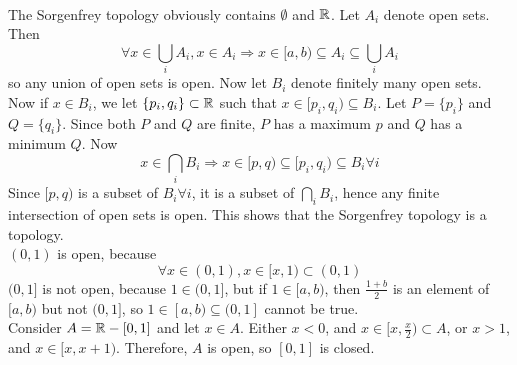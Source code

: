 \begin{solution}
 \\The Sorgenfrey topology obviously contains $\emptyset$ and $\mathbb{R}$. Let $A_i$ denote open sets. Then
 $$\forall x \in \bigcup_i A_i, x \in A_i \Rightarrow x \in [a,b) \subseteq A_i \subseteq \bigcup_i A_i$$
 so any union of open sets is open. Now let $B_i$ denote finitely many open sets. Now if $x \in B_i$, we let $\{p_i,q_i\} \subset \mathbb{R}$ such that $x \in [p_i,q_i) \subseteq B_i$. Let $P = \{p_i\}$ and $Q = \{q_i\}$. Since both $P$ and $Q$ are finite, $P$ has a maximum $p$ and $Q$ has a minimum $Q$.
 Now
 $$x \in \bigcap_i B_i \Rightarrow x \in [p,q) \subseteq [p_i,q_i) \subseteq B_i \forall i$$
 Since $[p,q)$ is a subset of $B_i \forall i$, it is a subset of $\bigcap_i B_i$, hence any finite intersection of open sets is open. This shows that the Sorgenfrey topology is a topology. \\
 $(0,1)$ is open, because
 $$\forall x \in (0,1), x \in [x,1) \subset (0,1)$$
 $(0,1]$ is not open, because $1 \in (0,1]$, but if $1 \in [a,b)$, then $\frac{1+b}{2}$ is an element of $[a,b)$ but not $(0,1]$, so $1 \in [a,b) \subseteq (0,1]$ cannot be true. \\
 Consider $A = \mathbb{R} - [0,1]$ and let $x \in A$. Either $x < 0$, and $x \in [x,\frac{x}{2}) \subset A$, or $x > 1$, and $x \in [x,x+1)$. Therefore, $A$ is open, so $[0,1]$ is closed.
\end{solution}



